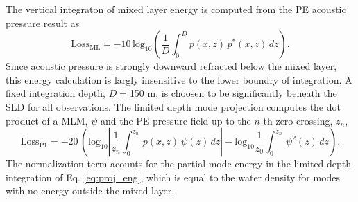 \documentclass[preprint,NumberedRefs]{JASA}
\begin{document}
The vertical integraton of mixed layer energy is computed from the PE acoustic pressure result as
\begin{equation}
    \textrm{Loss}_{\textrm{ML}} = -10 \, \textrm{log}_{10} \left( \frac{1}{D} \int^{D}_0 p(x, z) \, p^* (x, z) \,  dz \right).
    \label{eq:int_eng}
\end{equation}
Since acoustic pressure is strongly downward refracted below the mixed layer, this energy calculation is largly insensitive to the lower boundry of integration. A fixed integration depth, $D=$150 m, is choosen to be significantly beneath the SLD for all observations. The limited depth mode projection computes the dot product of a MLM, $\psi$ and the PE pressure field up to the $n$-th zero crossing, $z_n$,
\begin{equation}
    \textrm{Loss}_{\textrm{P1}} = -20 \, \left( \textrm{log}_{10} \left| \frac{1}{z_n} \int^{z_n}_0 \, p(x, z) \ \psi(z) \,  dz \right| - \textrm{log}_{10} \frac{1}{z_0} \int^{z_n}_0 \, \psi^2(z) \,  dz \right).
    \label{eq:proj_eng}
\end{equation}
The normalization term acounts for the partial mode energy in the limited depth integration of Eq. \eqref{eq:proj_eng}, which is equal to the water density for modes with no energy outside the mixed layer\citep{jensen2011computational}.

\end{document}
